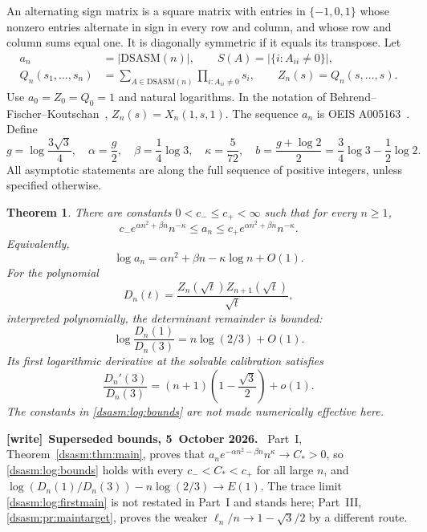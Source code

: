 \documentclass[11pt,letterpaper]{article}
\newtheorem{theorem}{Theorem}[section]
\theoremstyle{remark}\newtheorem{remark}[theorem]{Remark}
\newcommand{\DS}{\mathrm{DSASM}}\newcommand{\ASM}{\mathrm{ASM}}
\newenvironment{writenote}[1][]{\par\smallskip\begingroup\small
 \noindent\textbf{[write]}\if\relax\detokenize{#1}\relax\else~\textbf{#1.}\fi\ }%
 {\par\endgroup\smallskip}
\begin{document}
An alternating sign matrix is a square matrix with entries in
$\{-1,0,1\}$ whose nonzero entries alternate in sign in every row and
column, and whose row and column sums equal one. It is diagonally
symmetric if it equals its transpose. Let
\begin{equation}\label{dsasm:log:definitions}
\begin{split}
 a_n&=|\DS(n)|,\qquad S(A)=|\{i:A_{ii}\ne0\}|,\\
 Q_n(s_1,\ldots,s_n)&=\sum_{A\in\DS(n)}\prod_{i:A_{ii}\ne0}s_i,
 \qquad Z_n(s)=Q_n(s,\ldots,s).
\end{split}
\end{equation}
Use $a_0=Z_0=Q_0=1$ and natural logarithms. In the notation of
Behrend--Fischer--Koutschan~\cite{bfk}, $Z_n(s)=X_n(1,s,1)$.
The sequence $a_n$ is OEIS A005163~\cite{oeis}. Define
\begin{equation}\label{dsasm:log:constants}
 g=\log\frac{3\sqrt3}{4},\quad \alpha=\frac g2,\quad
 \beta=\frac14\log3,\quad \kappa=\frac5{72},\quad
 b=\frac{g+\log2}{2}=\frac34\log3-\frac12\log2.
\end{equation}
All asymptotic statements are along the full sequence of positive
integers, unless specified otherwise.

\begin{theorem}\label{dsasm:log:main}
There are constants $0<c_-\le c_+<\infty$ such that for every $n\ge1$,
\begin{equation}\label{dsasm:log:bounds}
 c_- e^{\alpha n^2+\beta n}n^{-\kappa}
 \le a_n\le c_+ e^{\alpha n^2+\beta n}n^{-\kappa}.
\end{equation}
Equivalently,
\begin{equation}\label{dsasm:log:logmain}
 \log a_n=\alpha n^2+\beta n-\kappa\log n+O(1).
\end{equation}
For the polynomial
\begin{equation}\label{dsasm:log:Ddef}
 D_n(t)=\frac{Z_n(\sqrt t)Z_{n+1}(\sqrt t)}{\sqrt t},
\end{equation}
interpreted polynomially, the determinant remainder is bounded:
\begin{equation}\label{dsasm:log:Dmain}
 \log\frac{D_n(1)}{D_n(3)}=n\log(2/3)+O(1).
\end{equation}
Its first logarithmic derivative at the solvable calibration satisfies
\begin{equation}\label{dsasm:log:firstmain}
 \frac{D_n'(3)}{D_n(3)}=(n+1)\left(1-\frac{\sqrt3}{2}\right)+o(1).
\end{equation}
The constants in \eqref{dsasm:log:bounds} are not made numerically effective here.
\end{theorem}
\begin{writenote}[Superseded bounds, 5~October 2026]
Part~I, Theorem~\ref{dsasm:thm:main}, proves that $a_ne^{-\alpha n^2-\beta n}n^\kappa\to C_*>0$, so \eqref{dsasm:log:bounds} holds with every $c_-<C_*<c_+$ for all large $n$, and $\log(D_n(1)/D_n(3))-n\log(2/3)\to E(1)$. The trace limit \eqref{dsasm:log:firstmain} is not restated in Part~I and stands here; Part~III, \eqref{dsasm:pr:maintarget}, proves the weaker $\ell_n/n\to1-\sqrt3/2$ by a different route.
\end{writenote}
\end{document}
